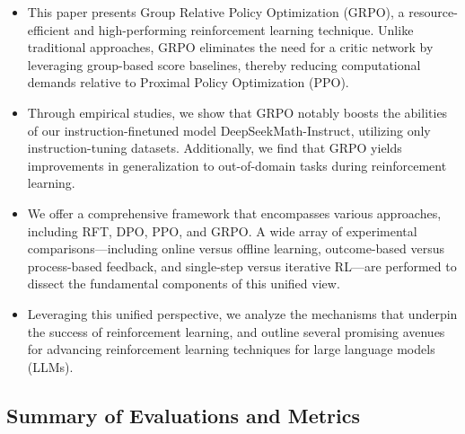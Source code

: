 \begin{itemize}[topsep=0pt]
    \item This paper presents Group Relative Policy Optimization (GRPO), a resource-efficient and high-performing reinforcement learning technique. Unlike traditional approaches, GRPO eliminates the need for a critic network by leveraging group-based score baselines, thereby reducing computational demands relative to Proximal Policy Optimization (PPO).
    \item Through empirical studies, we show that GRPO notably boosts the abilities of our instruction-finetuned model DeepSeekMath-Instruct, utilizing only instruction-tuning datasets. Additionally, we find that GRPO yields improvements in generalization to out-of-domain tasks during reinforcement learning.
    \item We offer a comprehensive framework that encompasses various approaches, including RFT, DPO, PPO, and GRPO. A wide array of experimental comparisons—including online versus offline learning, outcome-based versus process-based feedback, and single-step versus iterative RL—are performed to dissect the fundamental components of this unified view.
    \item Leveraging this unified perspective, we analyze the mechanisms that underpin the success of reinforcement learning, and outline several promising avenues for advancing reinforcement learning techniques for large language models (LLMs).
\end{itemize}

\subsection{Summary of Evaluations and Metrics}

